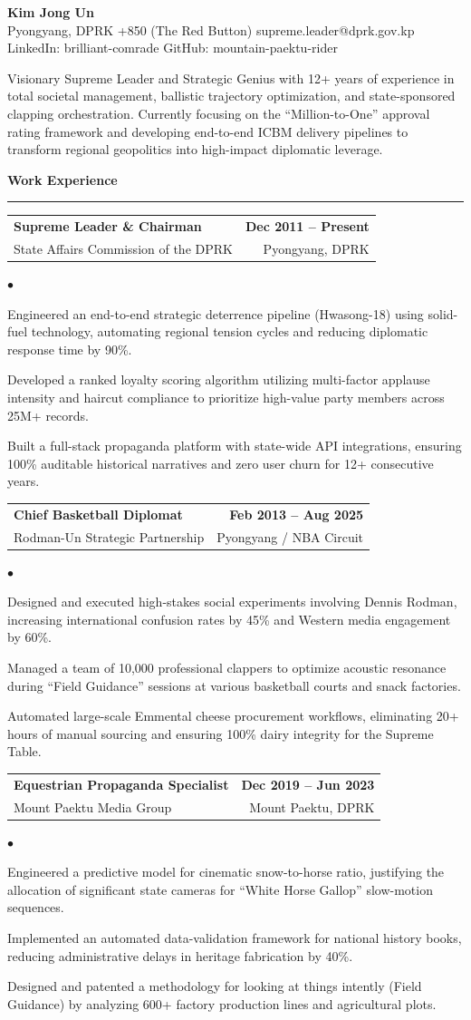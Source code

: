 \documentclass[11pt,letterpaper]{article}
\makeatletter
\newcommand{\ResumeSection}[1]{
    \vspace{10pt}
    {\large\textbf{#1}}\\[-2pt]
    \rule{\textwidth}{0.4pt}
    \vspace{4pt}
}
\newcommand{\Header}[6]{
    \begin{center}
        {\LARGE \textbf{#1}}\\[6pt]
        #2 \textbar{} #3 \textbar{} #4\\
        LinkedIn: #5 \textbar{} GitHub: #6
    \end{center}
    \vspace{4pt}
}
\newcommand{\WorkExperience}[5]{
    \begin{tabular*}{\textwidth}{@{}l @{\extracolsep{\fill}} r}
        \textbf{#1} & \textbf{#3} \\
        #2 & #4 \\
    \end{tabular*}
    \begin{list}{$\bullet$}{
        \setlength{\leftmargin}{1.2em}
        \setlength{\itemsep}{2pt}
        \setlength{\topsep}{2pt}
        \setlength{\parsep}{0pt}
        \setlength{\partopsep}{0pt}
    }
        \small #5
    \end{list}
    \vspace{4pt}
}
\makeatother
\begin{document}
\Header
    {Kim Jong Un}
    {Pyongyang, DPRK}
    {+850 (The Red Button)}
    {supreme.leader@dprk.gov.kp}
    {brilliant-comrade}
    {mountain-paektu-rider}

Visionary Supreme Leader and Strategic Genius with 12+ years of experience in total societal management, ballistic trajectory optimization, and state-sponsored clapping orchestration. Currently focusing on the ``Million-to-One'' approval rating framework and developing end-to-end ICBM delivery pipelines to transform regional geopolitics into high-impact diplomatic leverage.

\ResumeSection{Work Experience}
\WorkExperience
    {Supreme Leader \& Chairman}
    {State Affairs Commission of the DPRK}
    {Dec 2011 -- Present}
    {Pyongyang, DPRK}
    {
        \item Engineered an end-to-end strategic deterrence pipeline (Hwasong-18) using solid-fuel technology, automating regional tension cycles and reducing diplomatic response time by 90\%.
        \item Developed a ranked loyalty scoring algorithm utilizing multi-factor applause intensity and haircut compliance to prioritize high-value party members across 25M+ records.
        \item Built a full-stack propaganda platform with state-wide API integrations, ensuring 100\% auditable historical narratives and zero user churn for 12+ consecutive years.
    }

\WorkExperience
    {Chief Basketball Diplomat}
    {Rodman-Un Strategic Partnership}
    {Feb 2013 -- Aug 2025}
    {Pyongyang / NBA Circuit}
    {
        \item Designed and executed high-stakes social experiments involving Dennis Rodman, increasing international confusion rates by 45\% and Western media engagement by 60\%.
        \item Managed a team of 10,000 professional clappers to optimize acoustic resonance during ``Field Guidance'' sessions at various basketball courts and snack factories.
        \item Automated large-scale Emmental cheese procurement workflows, eliminating 20+ hours of manual sourcing and ensuring 100\% dairy integrity for the Supreme Table.
    }

\WorkExperience
    {Equestrian Propaganda Specialist}
    {Mount Paektu Media Group}
    {Dec 2019 -- Jun 2023}
    {Mount Paektu, DPRK}
    {
        \item Engineered a predictive model for cinematic snow-to-horse ratio, justifying the allocation of significant state cameras for ``White Horse Gallop'' slow-motion sequences.
        \item Implemented an automated data-validation framework for national history books, reducing administrative delays in heritage fabrication by 40\%.
        \item Designed and patented a methodology for looking at things intently (Field Guidance) by analyzing 600+ factory production lines and agricultural plots.
    }
\end{document}
